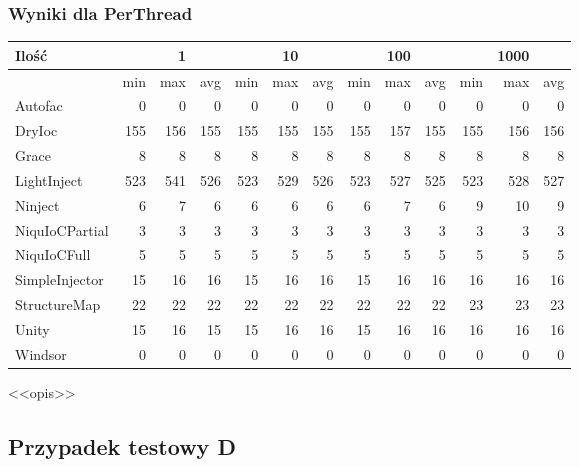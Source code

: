 \documentclass[12pt]{article}
\begin{document}
\subsubsection{Wyniki dla PerThread}
\begin{center}
\begin{small}
	\begin{tabular}{ | l | r r r | r r r | r r r | r r r | }
    		\hline
     		Ilość & & 1 & & & 10 & & & 100 & & & 1000 & \\ \hline
     		 & min & max & avg & min & max & avg & min & max & avg & min & max & avg \\ \hline
    		Autofac & 0 & 0 & 0 & 0 & 0 & 0 & 0 & 0 & 0 & 0 & 0 & 0 \\ \hline
		DryIoc & 155 & 156 & 155 & 155 & 155 & 155 & 155 & 157 & 155 & 155 & 156 & 156 \\ \hline
		Grace & 8 & 8 & 8 & 8 & 8 & 8 & 8 & 8 & 8 & 8 & 8 & 8 \\ \hline
		LightInject & 523 & 541 & 526 & 523 & 529 & 526 & 523 & 527 & 525 & 523 & 528 & 527 \\ \hline
		Ninject & 6 & 7 & 6 & 6 & 6 & 6 & 6 & 7 & 6 & 9 & 10 & 9 \\ \hline
		NiquIoCPartial & 3 & 3 & 3 & 3 & 3 & 3 & 3 & 3 & 3 & 3 & 3 & 3 \\ \hline
		NiquIoCFull & 5 & 5 & 5 & 5 & 5 & 5 & 5 & 5 & 5 & 5 & 5 & 5 \\ \hline
		SimpleInjector & 15 & 16 & 16 & 15 & 16 & 16 & 15 & 16 & 16 & 16 & 16 & 16 \\ \hline
		StructureMap & 22 & 22 & 22 & 22 & 22 & 22 & 22 & 22 & 22 & 23 & 23 & 23 \\ \hline
		Unity & 15 & 16 & 15 & 15 & 16 & 16 & 15 & 16 & 16 & 16 & 16 & 16 \\ \hline
		Windsor & 0 & 0 & 0 & 0 & 0 & 0 & 0 & 0 & 0 & 0 & 0 & 0 \\
    		\hline
  	\end{tabular}
\end{small}
\end{center}
<<opis>>


\subsection{Przypadek testowy D}
\end{document}
